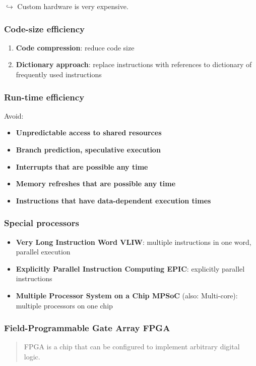 \documentclass{article}
\begin{document}


$\hookrightarrow$ Custom hardware is very expensive.

\subsubsection{Code-size efficiency}
\begin{enumerate}
  \item \textbf{Code compression}: reduce code size
  \item \textbf{Dictionary approach}: replace instructions with references to dictionary of frequently used instructions
\end{enumerate}

\subsubsection{Run-time efficiency}
Avoid:
\begin{itemize}
  \item \textbf{Unpredictable access to shared resources}
  \item \textbf{Branch prediction, speculative execution}
  \item \textbf{Interrupts that are possible any time}
  \item \textbf{Memory refreshes that are possible any time}
  \item \textbf{Instructions that have data-dependent execution times}
\end{itemize}

\subsubsection{Special processors}
\begin{itemize}
  \item \textbf{Very Long Instruction Word VLIW}: multiple instructions in one word, parallel execution
  \item \textbf{Explicitly Parallel Instruction Computing EPIC}: explicitly parallel instructions
  \item \textbf{Multiple Processor System on a Chip MPSoC} (also: Multi-core): multiple processors on one chip
\end{itemize}

\subsubsection{Field-Programmable Gate Array FPGA}
\begin{quote}FPGA is a chip that can be configured to implement arbitrary digital logic.\end{quote}
\end{document}
